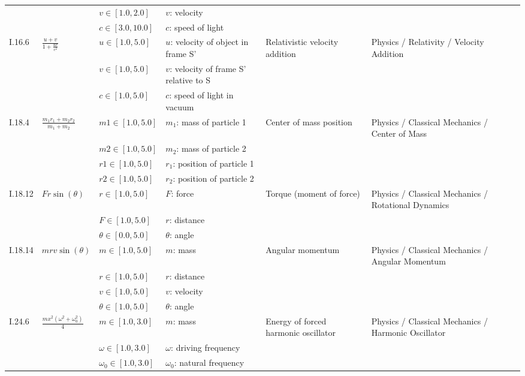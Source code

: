 \begin{longtable}{llllp{4cm}p{4cm}p{4cm}}
 &  & $\mathit{v} \in [1.0,2.0]$ & $v$: velocity &  &  & \\
 &  & $\mathit{c} \in [3.0,10.0]$ & $c$: speed of light &  &  & \\
\hline
I.16.6 & $\frac{u + v}{1 + \frac{u v}{c^{2}}}$ & $\mathit{u} \in [1.0,5.0]$ & $u$: velocity of object in frame S' & Relativistic velocity addition & Physics / Relativity / Velocity Addition & \\
 &  & $\mathit{v} \in [1.0,5.0]$ & $v$: velocity of frame S' relative to S &  &  & \\
 &  & $\mathit{c} \in [1.0,5.0]$ & $c$: speed of light in vacuum &  &  & \\
\hline
I.18.4 & $\frac{m_{1} r_{1} + m_{2} r_{2}}{m_{1} + m_{2}}$ & $\mathit{m1} \in [1.0,5.0]$ & $m_1$: mass of particle 1 & Center of mass position & Physics / Classical Mechanics / Center of Mass & \\
 &  & $\mathit{m2} \in [1.0,5.0]$ & $m_2$: mass of particle 2 &  &  & \\
 &  & $\mathit{r1} \in [1.0,5.0]$ & $r_1$: position of particle 1 &  &  & \\
 &  & $\mathit{r2} \in [1.0,5.0]$ & $r_2$: position of particle 2 &  &  & \\
\hline
I.18.12 & $F r \sin{\left(\theta \right)}$ & $\mathit{r} \in [1.0,5.0]$ & $F$: force & Torque (moment of force) & Physics / Classical Mechanics / Rotational Dynamics & \\
 &  & $\mathit{F} \in [1.0,5.0]$ & $r$: distance &  &  & \\
 &  & $\theta \in [0.0,5.0]$ & $\theta$: angle &  &  & \\
\hline
I.18.14 & $m r v \sin{\left(\theta \right)}$ & $\mathit{m} \in [1.0,5.0]$ & $m$: mass & Angular momentum & Physics / Classical Mechanics / Angular Momentum & \\
 &  & $\mathit{r} \in [1.0,5.0]$ & $r$: distance &  &  & \\
 &  & $\mathit{v} \in [1.0,5.0]$ & $v$: velocity &  &  & \\
 &  & $\theta \in [1.0,5.0]$ & $\theta$: angle &  &  & \\
\hline
I.24.6 & $\frac{m x^{2} \left(\omega^{2} + \omega_{0}^{2}\right)}{4}$ & $\mathit{m} \in [1.0,3.0]$ & $m$: mass & Energy of forced harmonic oscillator & Physics / Classical Mechanics / Harmonic Oscillator & \\
 &  & $\omega \in [1.0,3.0]$ & $\omega$: driving frequency &  &  & \\
 &  & $\omega_0 \in [1.0,3.0]$ & $\omega_0$: natural frequency &  &  & \\

\end{longtable}
